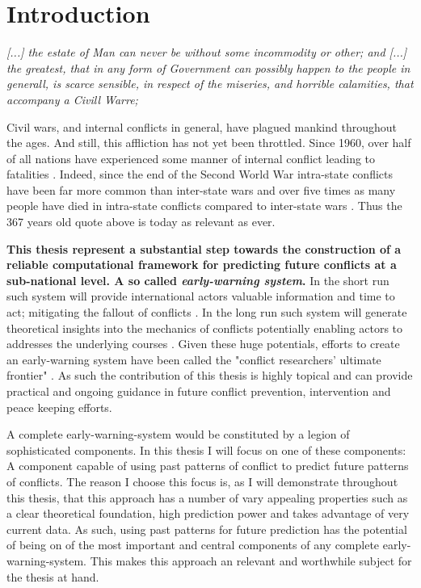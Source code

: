 \documentclass[a4paper]{article}
\begin{document}
\section{Introduction}

\begin{displayquote}
\emph{[...] the estate of Man can never be without some incommodity or other; and [...] the greatest, that in any form of Government can possibly happen to the people in generall, is scarce sensible, in respect of the miseries, and horrible calamities, that accompany a Civill Warre;} \cite[128]{Hobbes_1991}\par
\end{displayquote}

Civil wars, and internal conflicts in general, have plagued mankind throughout the ages. And still, this affliction has not yet been throttled. Since 1960, over half of all nations have experienced some manner of internal conflict leading to fatalities \citep[3-4]{Blattman_Miguel_2010}. Indeed, since the end of the Second World War intra-state conflicts have been far more common than inter-state wars and over five times as many people have died in intra-state conflicts compared to inter-state wars \citep[563]{Collier_Hoeffler_2004}. Thus the 367 years old quote above is today as relevant as ever.\par

\textbf{This thesis represent a substantial step towards the construction of a reliable computational framework for predicting future conflicts at a sub-national level. A so called \emph{early-warning system}.} In the short run such system will provide international actors valuable information and time to act; mitigating the fallout of conflicts \citep{Ward_Greenhill_Bakke_2010, perry_2013}. In the long run such system will generate theoretical insights into the mechanics of conflicts potentially enabling actors to addresses the underlying courses \citep{Schrodt_2014, chadefaux2017conflict}. Given these huge potentials, efforts to create an early-warning system have been called the "conflict researchers’ ultimate frontier" \citep[474]{cederman2017predicting}. As such the contribution of this thesis is highly topical and can provide practical and ongoing guidance in future conflict prevention, intervention and peace keeping efforts.\par

A complete early-warning-system would be constituted by a legion of sophisticated components. In this thesis I will focus on one of these components: A component capable of using past patterns of conflict to predict future patterns of conflicts. The reason I choose this focus is, as I will demonstrate throughout this thesis, that this approach has a number of vary appealing properties such as a clear theoretical foundation, high prediction power and takes advantage of very current data. As such, using past patterns for future prediction has the potential of being on of the most important and central components of any complete early-warning-system. This makes this approach an relevant and worthwhile subject for the thesis at hand.\par
\end{document}
